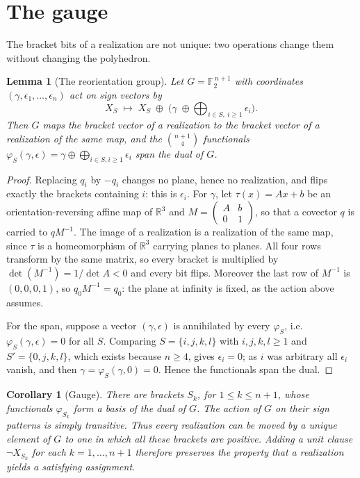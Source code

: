 \documentclass[11pt,reqno]{amsart}
\theoremstyle{plain}
\newtheorem{lemma}[theorem]{Lemma}
\newtheorem{corollary}[theorem]{Corollary}
\theoremstyle{definition}
\newcommand{\RR}{\mathbb{R}}
\newcommand{\FF}{\mathbb{F}_2}
\newcommand{\xor}{\oplus}
\DeclareMathOperator{\dett}{det}
\begin{document}
\section{The gauge}\label{sec:gauge}

The bracket bits of a realization are not unique: two operations change them without changing the
polyhedron.

\begin{lemma}[The reorientation group]\label{lem:gaugegroup}
Let $G=\FF^{\,n+1}$ with coordinates $(\gamma,\epsilon_1,\dots,\epsilon_n)$ act on sign vectors by
\[
   X_S\;\longmapsto\;X_S\;\xor\;\Big(\gamma\;\xor\bigoplus_{i\in S,\ i\ge1}\epsilon_i\Big).
\]
Then $G$ maps the bracket vector of a realization to the bracket vector of a realization of the same
map, and the $\binom{n+1}{4}$ functionals $\varphi_S(\gamma,\epsilon)=\gamma\xor\bigoplus_{i\in S,
i\ge1}\epsilon_i$ span the dual of $G$.
\end{lemma}

\begin{proof}
Replacing $q_i$ by $-q_i$ changes no plane, hence no realization, and flips exactly the brackets
containing $i$: this is $\epsilon_i$. For $\gamma$, let $\tau(x)=Ax+b$ be an orientation-reversing
affine map of $\RR^3$ and $M=\left(\begin{smallmatrix}A&b\\0&1\end{smallmatrix}\right)$, so that a covector $q$
is carried to $qM^{-1}$. The image of a realization is a realization of the same map, since $\tau$ is
a homeomorphism of $\RR^3$ carrying planes to planes. All four rows transform by the same matrix, so
every bracket is multiplied by $\dett(M^{-1})=1/\dett A<0$ and every bit flips. Moreover the last row
of $M^{-1}$ is $(0,0,0,1)$, so $q_0M^{-1}=q_0$: the plane at infinity is fixed, as the action above
assumes.

For the span, suppose a vector $(\gamma,\epsilon)$ is annihilated by every $\varphi_S$, i.e.\
$\varphi_S(\gamma,\epsilon)=0$ for all $S$. Comparing $S=\{i,j,k,l\}$ with $i,j,k,l\ge1$ and
$S'=\{0,j,k,l\}$, which exists because $n\ge4$, gives $\epsilon_i=0$; as $i$ was arbitrary all
$\epsilon_i$ vanish, and then $\gamma=\varphi_S(\gamma,0)=0$. Hence the functionals span the dual.
\end{proof}

\begin{corollary}[Gauge]\label{cor:gauge}
There are brackets $S_k$, for $1\le k\le n+1$, whose functionals $\varphi_{S_k}$
form a basis of the dual of $G$. The action of $G$ on their sign patterns is
simply transitive. Thus every realization can be moved by a unique element of $G$
to one in which all these brackets are positive. Adding a unit clause
$\neg X_{S_k}$ for each $k=1,\dots,n+1$ therefore preserves the property that a realization yields a
satisfying assignment.
\end{corollary}
\end{document}
